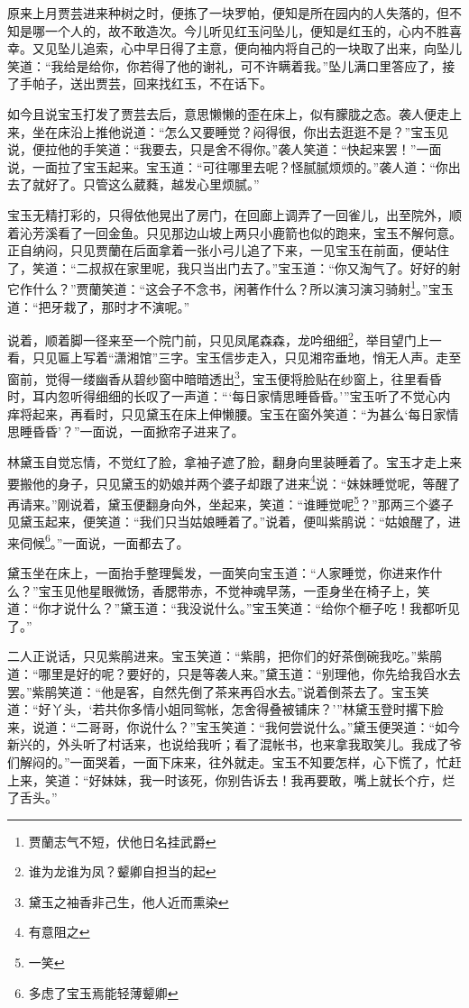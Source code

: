 \documentclass[12pt,oneside]{book}
\begin{document}
原来上月贾芸进来种树之时，便拣了一块罗帕，便知是所在园内的人失落的，但不知是哪一个人的，故不敢造次。今儿听见红玉问坠儿，便知是红玉的，心内不胜喜幸。又见坠儿追索，心中早日得了主意，便向袖内将自己的一块取了出来，向坠儿笑道：“我给是给你，你若得了他的谢礼，可不许瞒着我。”坠儿满口里答应了，接了手帕子，送出贾芸，回来找红玉，不在话下。

如今且说宝玉打发了贾芸去后，意思懒懒的歪在床上，似有朦胧之态。袭人便走上来，坐在床沿上推他说道：“怎么又要睡觉？闷得很，你出去逛逛不是？”宝玉见说，便拉他的手笑道：“我要去，只是舍不得你。”袭人笑道：“快起来罢！”一面说，一面拉了宝玉起来。宝玉道：“可往哪里去呢？怪腻腻烦烦的。”袭人道：“你出去了就好了。只管这么葳蕤，越发心里烦腻。”

宝玉无精打彩的，只得依他晃出了房门，在回廊上调弄了一回雀儿，出至院外，顺着沁芳溪看了一回金鱼。只见那边山坡上两只小鹿箭也似的跑来，宝玉不解何意。正自纳闷，只见贾蘭在后面拿着一张小弓儿追了下来，一见宝玉在前面，便站住了，笑道：“二叔叔在家里呢，我只当出门去了。”宝玉道：“你又淘气了。好好的射它作什么？”贾蘭笑道：“这会子不念书，闲著作什么？所以演习演习骑射\footnote{贾蘭志气不短，伏他日名挂武爵}。”宝玉道：“把牙栽了，那时才不演呢。”

说着，顺着脚一径来至一个院门前，只见凤尾森森，龙吟细细\footnote{谁为龙谁为凤？颦卿自担当的起}，举目望门上一看，只见匾上写着“潇湘馆”三字。宝玉信步走入，只见湘帘垂地，悄无人声。走至窗前，觉得一缕幽香从碧纱窗中暗暗透出\footnote{黛玉之袖香非己生，他人近而熏染}，宝玉便将脸贴在纱窗上，往里看昏时，耳内忽听得细细的长叹了一声道：“‘每日家情思睡昏昏。’”宝玉听了不觉心内痒将起来，再看时，只见黛玉在床上伸懒腰。宝玉在窗外笑道：“为甚么‘每日家情思睡昏昏’？”一面说，一面掀帘子进来了。

林黛玉自觉忘情，不觉红了脸，拿袖子遮了脸，翻身向里装睡着了。宝玉才走上来要搬他的身子，只见黛玉的奶娘并两个婆子却跟了进来\footnote{有意阻之}说：“妹妹睡觉呢，等醒了再请来。”刚说着，黛玉便翻身向外，坐起来，笑道：“谁睡觉呢\footnote{一笑}？”那两三个婆子见黛玉起来，便笑道：“我们只当姑娘睡着了。”说着，便叫紫鹃说：“姑娘醒了，进来伺候\footnote{多虑了宝玉焉能轻薄颦卿}。”一面说，一面都去了。

黛玉坐在床上，一面抬手整理鬓发，一面笑向宝玉道：“人家睡觉，你进来作什么？”宝玉见他星眼微饧，香腮带赤，不觉神魂早荡，一歪身坐在椅子上，笑道：“你才说什么？”黛玉道：“我没说什么。”宝玉笑道：“给你个榧子吃！我都听见了。”

二人正说话，只见紫鹃进来。宝玉笑道：“紫鹃，把你们的好茶倒碗我吃。”紫鹃道：“哪里是好的呢？要好的，只是等袭人来。”黛玉道：“别理他，你先给我舀水去罢。”紫鹃笑道：“他是客，自然先倒了茶来再舀水去。”说着倒茶去了。宝玉笑道：“好丫头，‘若共你多情小姐同鸳帐，怎舍得叠被铺床？’”林黛玉登时撂下脸来，说道：“二哥哥，你说什么？”宝玉笑道：“我何尝说什么。”黛玉便哭道：“如今新兴的，外头听了村话来，也说给我听；看了混帐书，也来拿我取笑儿。我成了爷们解闷的。”一面哭着，一面下床来，往外就走。宝玉不知要怎样，心下慌了，忙赶上来，笑道：“好妹妹，我一时该死，你别告诉去！我再要敢，嘴上就长个疔，烂了舌头。”
\end{document}
